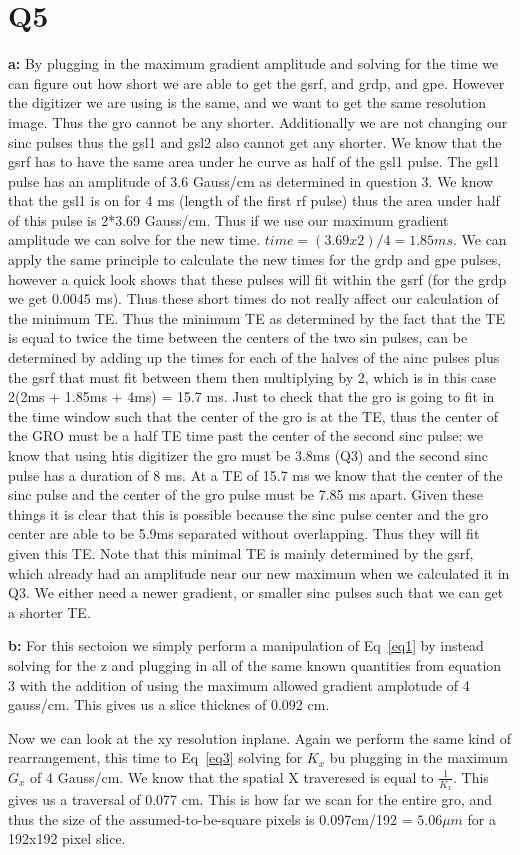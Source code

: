 \documentclass[12pt]{article}
\begin{document}
\section{Q5}
\noindent\textbf{a: }
By plugging in the maximum gradient amplitude and solving for the time we can figure out how short we are able to get the gsrf, and grdp, and gpe. However the digitizer we are using is the same, and we want to get the same resolution image. Thus the gro cannot be any shorter. Additionally we are not changing our sinc pulses thus the gsl1 and gsl2 also cannot get any shorter. We know that the gsrf has to have the same area under he curve as half of the gsl1 pulse. The gsl1 pulse has an amplitude of 3.6 Gauss/cm as determined in question 3. We know that the gsl1 is on for 4 ms (length of the first rf pulse) thus the area under half of this pulse is 2*3.69 Gauss/cm. Thus if we use our maximum gradient amplitude we can solve for the new time. $time = (3.69x2)/4 = 1.85 ms$. We can apply the same principle to calculate the new times for the grdp and gpe pulses, however a quick look shows that these pulses will fit within the gsrf (for the grdp we get 0.0045 ms). Thus these short times do not really affect our calculation of the minimum TE. Thus the minimum TE as determined by the fact that the TE is equal to twice the time between the centers of the two sin pulses, can be determined by adding up the times for each of the halves of the ainc pulses plus the gsrf that must fit between them then multiplying by 2, which is in this case 2(2ms + 1.85ms + 4ms) = 15.7 ms. Just to check that the gro is going to fit in the time window such that the center of the gro is at the TE, thus the center of the GRO must be a half TE time past the center of the second sinc pulse: we know that using htis digitizer the gro must be 3.8ms (Q3) and the second sinc pulse has a duration of 8 ms. At a TE of 15.7 ms we know that the center of the sinc pulse and the center of the gro pulse must be 7.85 ms apart. Given these things it is clear that this is possible because the sinc pulse center and the gro center are able to be 5.9ms separated without overlapping. Thus they will fit given this TE. Note that this minimal TE is mainly determined by the gsrf, which already had an amplitude near our new maximum when we calculated it in Q3. We either need a newer gradient, or smaller sinc pulses such that we can get a shorter TE.

\noindent\textbf{b: }
For this sectoion we simply perform a manipulation of Eq~\ref{eq1} by instead solving for the z and plugging in all of the same known quantities from equation 3 with the addition of using the maximum allowed gradient amplotude of 4 gauss/cm. This gives us a slice thicknes of 0.092 cm.

Now we can look at the xy resolution inplane. Again we perform the same kind of rearrangement, this time to Eq~\ref{eq3} solving for $K_x$ bu plugging in the maximum $G_x$ of 4 Gauss/cm. We know that the spatial X traveresed is equal to $\frac{1}{K_x}$. This gives us a traversal of 0.077 cm. This is how far we scan for the entire gro, and thus the size of the assumed-to-be-square pixels is 0.097cm/192 = $5.06\mu m$ for a 192x192 pixel slice.
\end{document}
